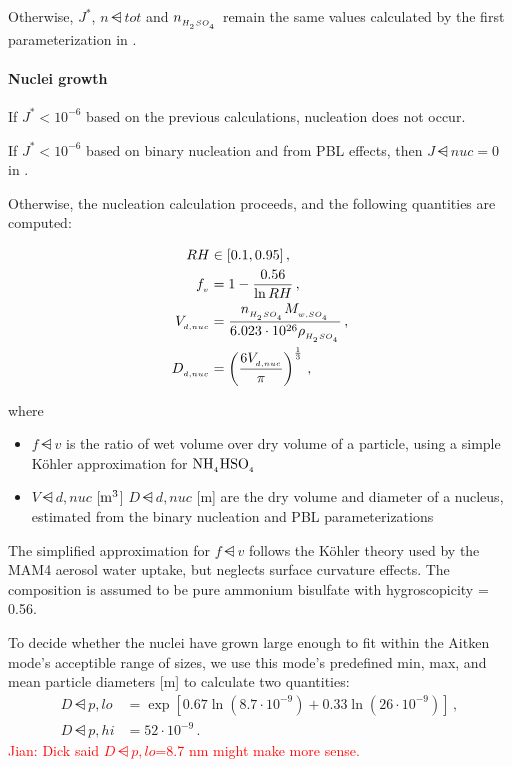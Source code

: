 Otherwise, $J^*$, $n\dsub{tot}$ and $n_{_{H_{_2}SO_{_4}}}$ remain the same values
calculated by the first parameterization in .

\paragraph{Nuclei growth} 

If $J^* < 10^{-6}$ based on the previous calculations, nucleation does not
occur.

\begin{assume}
  If $J^* < 10^{-6}$ based on binary nucleation and from PBL effects, then
  $J\dsub{nuc} = 0$ in .
\end{assume}

Otherwise, the nucleation calculation proceeds, and the following quantities are
computed:

\begin{align}
  RH &\in [0.1, 0.95] \,, \\
  f_{_{v}} &= 1 - \frac{0.56}{\ln RH} \,, \\
  V_{_{d,nuc}} &= \frac{n_{_{H_{_2}SO_{_4}}} M_{_{w,SO_{_4}}}}
                   {6.023 \cdot 10^{26} \rho_{_{H_{_2}SO_{_4}}}} \,, \\
  D_{_{d,nuc}} &= \left( \frac{6 V_{_{d,nuc}}}{\pi} \right)^{\frac{1}{3}} \,,
\end{align}

where

\begin{itemize}
  \item $f\dsub{v}$ is the ratio of wet volume over dry volume of a particle,
        using a simple K\"ohler approximation for $\rm NH_{_{4}}HSO_{_{4}}$
  \item $V\dsub{d,nuc}$ [$\rm m^3$] $D\dsub{d,nuc}$ [m] are the dry volume and
        diameter of a nucleus, estimated from the binary nucleation and PBL
        parameterizations
\end{itemize}

The simplified approximation for $f\dsub{v}$ follows the K\"ohler theory used by
the MAM4 aerosol water uptake, but neglects surface curvature effects. The
composition is assumed to be pure ammonium bisulfate with hygroscopicity = 0.56.

To decide whether the nuclei have grown large enough to fit within the Aitken
mode's acceptible range of sizes, we use this mode's predefined min, max, and
mean particle diameters [m] to calculate two quantities:
\begin{align}
  D\dsub{p,lo} &= \exp \left[ 0.67 \ln (8.7 \cdot 10^{-9}) +
                            0.33 \ln (26 \cdot 10^{-9}) \right] \,, \\   %
  D\dsub{p,hi} &= 52 \cdot 10^{-9} \,.
\end{align}
\textcolor{red}{Jian: Dick said $D\dsub{p,lo}$=8.7 nm might make more sense.}

